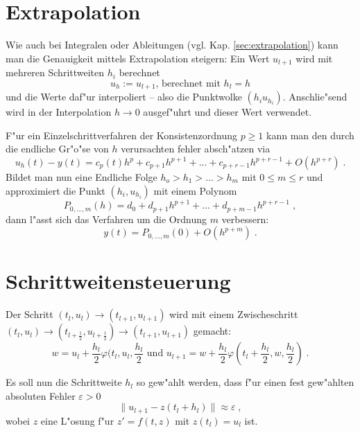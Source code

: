 \documentclass[a4paper]{book}
\newcommand{\abs}{\bigskip \noindent}
\begin{document}
\section{Extrapolation}
\label{sec:extrapolation-1}

Wie auch bei Integralen oder Ableitungen
(vgl. Kap. \ref{sec:extrapolation}) kann man die Genauigkeit mittels
Extrapolation steigern: Ein Wert $u_{l+1}$ wird mit mehreren
Schrittweiten $h_i$ berechnet 
\begin{equation*}
  u_h := u_{l+1}\text{, berechnet mit } h_l = h 
\end{equation*}
und die Werte daf"ur interpoliert -- also die Punktwolke $(h_i
u_{h_i})$. Anschlie"send wird in der Interpolation $h\to 0$
ausgef"uhrt und dieser Wert verwendet.

\abs
F"ur ein Einzelschrittverfahren der Konsistenzordnung $p\geq 1$ kann
man den durch die endliche Gr"o"se von $h$ verursachten fehler
absch"atzen via
\begin{equation*}
  u_h(t) - y(t) = c_p(t) h^p + c_{p+1}h^{p+1} + ... +
  c_{p+r-1}h^{p+r-1} + O(h^{p+r}) \;.
\end{equation*}
Bildet man nun eine Endliche Folge $h_o > h_1 > ... > h_m$ mit $0 \leq
m \leq r$ und approximiert die Punkt $(h_i , u_{h_i})$ mit einem
Polynom 
\begin{equation*}
  P_{0,...,m}(h) = d_0 + d_{p+1}h^{p+1} + ... + d_{p+m-1}h^{p+r-1} \;,
\end{equation*}
dann l"asst sich das Verfahren um die Ordnung $m$ verbessern:
\begin{equation*}
  y(t) = P_{0,...,m}(0) + O(h^{p+m}) \;.
\end{equation*}




\section{Schrittweitensteuerung}
\label{sec:schrittweitensteuerung}

Der Schritt $(t_l, u_l) \to (t_{l+1}, u_{l+1})$ wird mit einem
Zwischeschritt $(t_l, u_l)\to (t_{l+\frac{1}{2}}, u_{l+\frac{1}{2}})
\to (t_{l+1}, u_{l+1})$ gemacht:
\begin{equation}
  \label{eq:75}
  w = u_l + \frac{h_l}{2} \varphi( t_l, u_l , \frac{h_l}{2} \text{ und
  } u_{l+1} = w + \frac{h_l}{2} \varphi(t_{l} + \frac{h_l}{2} , w ,
  \frac{h_l}{2} ) \;.
\end{equation}

Es soll nun die Schrittweite $h_l$ so gew"ahlt werden, dass f"ur einen
fest gew"ahlten absoluten Fehler $\varepsilon > 0$
\begin{equation}
  \label{eq:76}
  \| u_{l+1} - z(t_l + h_l) \| \approx \varepsilon \;,
\end{equation}
wobei $z$ eine  L"osung f"ur $z' = f(t,z)$ mit $z(t_l) = u_l$ ist.
\end{document}
